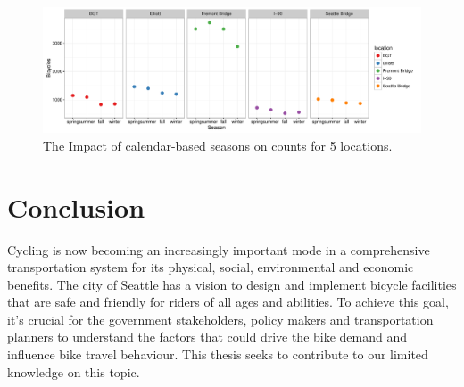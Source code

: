 \documentclass [11pt, proquest] {uwthesis}[2015/03/03]
\begin{document}
\begin{figure}
  \includegraphics[width=1\textwidth]{figures/5sites/Sim_season} 
 \caption{The Impact of calendar-based seasons on counts for 5 locations. }
 \label{fig:Sim_season}
\end{figure}


\chapter{Conclusion}

Cycling is now becoming an increasingly important mode in a comprehensive transportation system for its physical, social, environmental and economic benefits. The city of Seattle has a vision to design and implement bicycle facilities that are safe and friendly for riders of all ages and abilities. To achieve this goal, it's crucial for the government stakeholders, policy makers and transportation planners to understand the factors that could drive the bike demand and influence bike travel behaviour. This thesis seeks to contribute to our limited knowledge on this topic.


\end{document}
